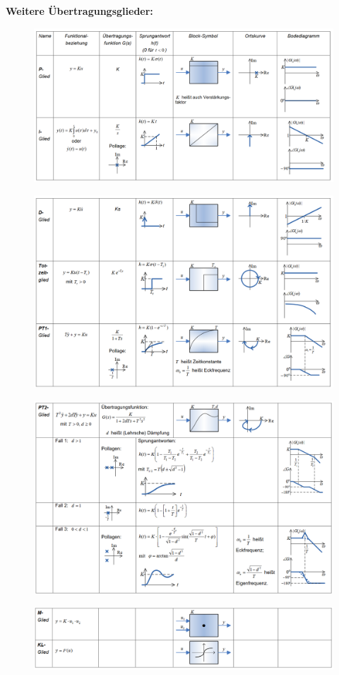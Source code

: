 \documentclass[10pt,a4paper]{article}
\begin{document}
\textbf{Weitere Übertragungsglieder:}
\begin{figure}[H]
	\includegraphics[width=1\columnwidth]{imgs/bb2_2a.png}
\end{figure}
\begin{figure}[H]
	\includegraphics[width=1\columnwidth]{imgs/bb2_2b.png}
\end{figure}
\begin{figure}[H]
	\includegraphics[width=1\columnwidth]{imgs/bb2_2c.png}
\end{figure}
\begin{figure}[H]
	\includegraphics[width=1\columnwidth]{imgs/bb2_2d.png}
\end{figure}
\end{document}
